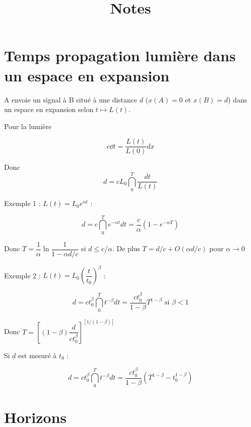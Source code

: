\documentclass[11pt]{article} %
\title{Notes}
\author{}
\date{} %
\begin{document}
\maketitle

\section{Temps propagation lumière dans un espace en expansion}

A envoie un signal à B situé à une distance $d$ ($x(A) = 0$ et $x(B) = d$) dans un espace en expansion selon $t \mapsto L(t)$. 

Pour la lumière

\begin{equation}
c \dd t = \dfrac{L(t)}{L(0)} dx
\end{equation}

Donc \begin{equation}
d = cL_0 \dint_0^T \dfrac{dt}{L(t)}
\end{equation}


Exemple 1 : $L(t) = L_0 e^{\alpha t}$ :

 \begin{equation}
d = c \dint_0^T e^{-\alpha t} dt = \dfrac{c}{\alpha} \left ( 1 - e^{-\alpha T} \right )
\end{equation}

Donc $T = \dfrac{1}{\alpha} \ln { \dfrac{1}{1-\alpha d/c}}$ si $d \leq c/\alpha$.
De plus $T = d/c + O(\alpha d/c)$ pour $\alpha \to 0$

Exemple 2 : $L(t) = L_0 \left ( \dfrac{t}{t_0} \right )^\beta$ :

 \begin{equation}
d = c t_0 ^\beta \dint_0^T t^{-\beta} dt = \dfrac{ct_0^\beta} {1-\beta}  T^{1-\beta}  \textrm{ si } \beta < 1
\end{equation}

Donc $T = \left [ (1-\beta) \dfrac{d}{ct_0^\beta} \right ] ^ { \left [1/(1-\beta)\right ] }$

Si $d$ est mesuré à $t_0$ :

 \begin{equation}
d = c t_0 ^\beta \dint_0^T t^{-\beta} dt = \dfrac{ct_0^\beta} {1-\beta}  \left ( T^{1-\beta} - t_0^{1-\beta} \right ) 
\end{equation}

\section{Horizons}
\end{document}
